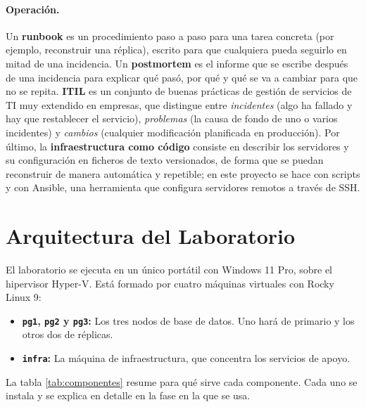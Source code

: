 \documentclass[11pt, a4paper, titlepage]{article}
\newcommand{\cod}[1]{\texttt{#1}}
\begin{document}
\paragraph{Operación.} Un \textbf{runbook} es un procedimiento paso a paso para una tarea concreta (por ejemplo, reconstruir una réplica), escrito para que cualquiera pueda seguirlo en mitad de una incidencia. Un \textbf{postmortem} es el informe que se escribe después de una incidencia para explicar qué pasó, por qué y qué se va a cambiar para que no se repita. \textbf{ITIL} es un conjunto de buenas prácticas de gestión de servicios de TI muy extendido en empresas, que distingue entre \textit{incidentes} (algo ha fallado y hay que restablecer el servicio), \textit{problemas} (la causa de fondo de uno o varios incidentes) y \textit{cambios} (cualquier modificación planificada en producción). Por último, la \textbf{infraestructura como código} consiste en describir los servidores y su configuración en ficheros de texto versionados, de forma que se puedan reconstruir de manera automática y repetible; en este proyecto se hace con scripts y con Ansible, una herramienta que configura servidores remotos a través de SSH.

\section{Arquitectura del Laboratorio}

El laboratorio se ejecuta en un único portátil con Windows 11 Pro, sobre el hipervisor Hyper-V. Está formado por cuatro máquinas virtuales con Rocky Linux 9:

\begin{itemize}
    \item \textbf{\cod{pg1}, \cod{pg2} y \cod{pg3}:} Los tres nodos de base de datos. Uno hará de primario y los otros dos de réplicas.
    \item \textbf{\cod{infra}:} La máquina de infraestructura, que concentra los servicios de apoyo.
\end{itemize}

La tabla \ref{tab:componentes} resume para qué sirve cada componente. Cada uno se instala y se explica en detalle en la fase en la que se usa.
\end{document}
